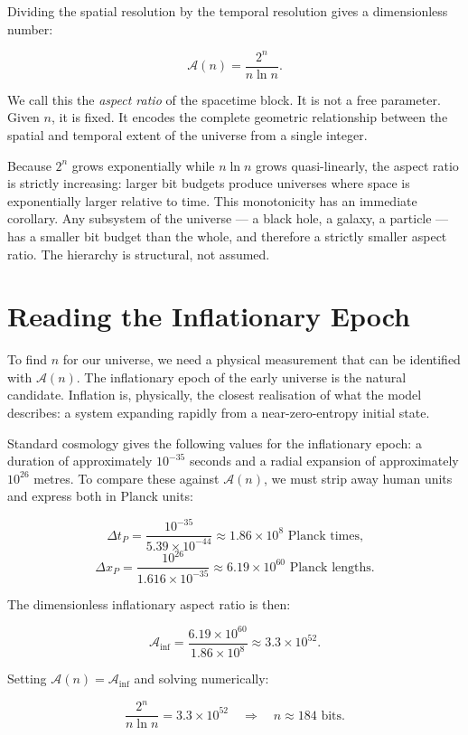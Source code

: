 Dividing the spatial resolution by the temporal resolution gives a
dimensionless number:

\[
\mathcal{A}(n) = \frac{2^n}{n \ln n}.
\]

We call this the \emph{aspect ratio} of the spacetime block. It is not a
free parameter. Given $n$, it is fixed. It encodes the complete geometric
relationship between the spatial and temporal extent of the universe from a
single integer.

Because $2^n$ grows exponentially while $n \ln n$ grows quasi-linearly,
the aspect ratio is strictly increasing: larger bit budgets produce
universes where space is exponentially larger relative to time. This
monotonicity has an immediate corollary. Any subsystem of the universe ---
a black hole, a galaxy, a particle --- has a smaller bit budget than the
whole, and therefore a strictly smaller aspect ratio. The hierarchy is
structural, not assumed.

\section{Reading the Inflationary Epoch}

To find $n$ for our universe, we need a physical measurement that can be
identified with $\mathcal{A}(n)$. The inflationary epoch of the early
universe is the natural candidate. Inflation is, physically, the closest
realisation of what the model describes: a system expanding rapidly from a
near-zero-entropy initial state.

Standard cosmology gives the following values for the inflationary epoch:
a duration of approximately $10^{-35}$ seconds and a radial expansion of
approximately $10^{26}$ metres. To compare these against $\mathcal{A}(n)$,
we must strip away human units and express both in Planck units:

\[
\Delta t_P = \frac{10^{-35}}{5.39 \times 10^{-44}} \approx 1.86 \times 10^8
\text{ Planck times,}
\]
\[
\Delta x_P = \frac{10^{26}}{1.616 \times 10^{-35}} \approx 6.19 \times 10^{60}
\text{ Planck lengths.}
\]

The dimensionless inflationary aspect ratio is then:

\[
\mathcal{A}_{\mathrm{inf}} = \frac{6.19 \times 10^{60}}{1.86 \times 10^8}
\approx 3.3 \times 10^{52}.
\]

Setting $\mathcal{A}(n) = \mathcal{A}_{\mathrm{inf}}$ and solving numerically:

\[
\frac{2^n}{n \ln n} = 3.3 \times 10^{52}
\quad \Longrightarrow \quad
\boxed{n \approx 184 \text{ bits.}}
\]

